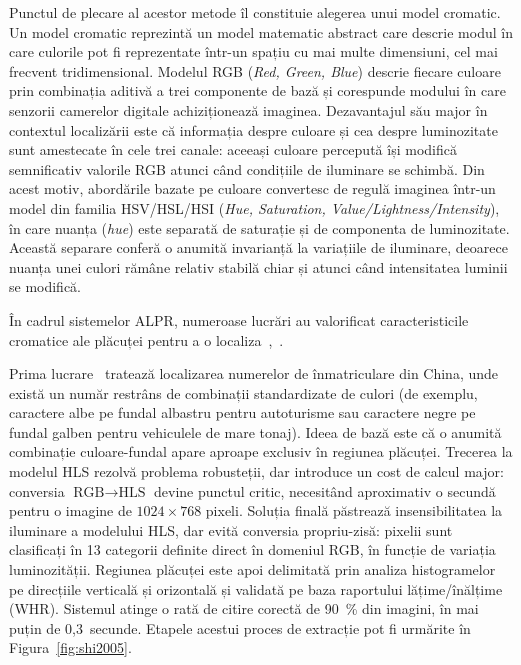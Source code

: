 Punctul de plecare al acestor metode îl constituie alegerea unui model cromatic. Un model cromatic reprezintă un model matematic abstract care descrie modul în care culorile pot fi reprezentate într-un spațiu cu mai multe dimensiuni, cel mai frecvent tridimensional. Modelul RGB (\textit{Red, Green, Blue}) descrie fiecare culoare prin combinația aditivă a trei componente de bază și corespunde modului în care senzorii camerelor digitale achiziționează imaginea. Dezavantajul său major în contextul localizării este că informația despre culoare și cea despre luminozitate sunt amestecate în cele trei canale: aceeași culoare percepută își modifică semnificativ valorile RGB atunci când condițiile de iluminare se schimbă. Din acest motiv, abordările bazate pe culoare convertesc de regulă imaginea într-un model din familia HSV/HSL/HSI (\textit{Hue, Saturation, Value/Lightness/Intensity}), în care nuanța (\emph{hue}) este separată de saturație și de componenta de luminozitate. Această separare conferă o anumită invarianță la variațiile de iluminare, deoarece nuanța unei culori rămâne relativ stabilă chiar și atunci când intensitatea luminii se modifică.

În cadrul sistemelor ALPR, numeroase lucrări au valorificat caracteristicile cromatice ale plăcuței pentru a o localiza~\cite{shi2005automatic},~\cite{chang2004automatic}.

Prima lucrare~\cite{shi2005automatic} tratează localizarea numerelor de înmatriculare din China, unde există un număr restrâns de combinații standardizate de culori (de exemplu, caractere albe pe fundal albastru pentru autoturisme sau caractere negre pe fundal galben pentru vehiculele de mare tonaj). Ideea de bază este că o anumită combinație culoare-fundal apare aproape exclusiv în regiunea plăcuței. Trecerea la modelul HLS rezolvă problema robusteții, dar introduce un cost de calcul major: conversia $\text{RGB} \rightarrow \text{HLS}$ devine punctul critic, necesitând aproximativ o secundă pentru o imagine de $1024 \times 768$ pixeli. Soluția finală păstrează insensibilitatea la iluminare a modelului HLS, dar evită conversia propriu-zisă: pixelii sunt clasificați în 13 categorii definite direct în domeniul RGB, în funcție de variația luminozității. Regiunea plăcuței este apoi delimitată prin analiza histogramelor pe direcțiile verticală și orizontală și validată pe baza raportului lățime/înălțime (WHR). Sistemul atinge o rată de citire corectă de 90~\% din imagini, în mai puțin de 0,3~secunde. Etapele acestui proces de extracție pot fi urmărite în Figura~\ref{fig:shi2005}.

